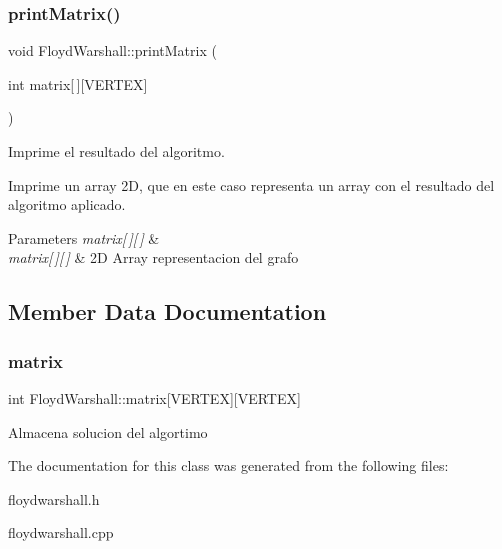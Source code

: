 \subsubsection{\texorpdfstring{print\+Matrix()}{printMatrix()}}
{\footnotesize\ttfamily void Floyd\+Warshall\+::print\+Matrix (\begin{DoxyParamCaption}\item[{int}]{matrix\mbox{[}$\,$\mbox{]}\mbox{[}\+V\+E\+R\+T\+E\+X\mbox{]} }\end{DoxyParamCaption})}



Imprime el resultado del algoritmo. 

Imprime un array 2D, que en este caso representa un array con el resultado del algoritmo aplicado.


\begin{DoxyParams}{Parameters}
{\em matrix\mbox{[}$\,$\mbox{]}\mbox{[}$\,$\mbox{]}} & \\
\hline
{\em matrix\mbox{[}$\,$\mbox{]}\mbox{[}$\,$\mbox{]}} & 2D Array representacion del grafo \\
\hline
\end{DoxyParams}


\subsection{Member Data Documentation}
\mbox{\label{classFloydWarshall_a391d930a37f05729d69d27374e715c33}} 
\subsubsection{\texorpdfstring{matrix}{matrix}}
{\footnotesize\ttfamily int Floyd\+Warshall\+::matrix\mbox{[}V\+E\+R\+T\+EX\mbox{]}\mbox{[}V\+E\+R\+T\+EX\mbox{]}}

Almacena solucion del algortimo 

The documentation for this class was generated from the following files\+:\begin{DoxyCompactItemize}
\item 
floydwarshall.\+h\item 
floydwarshall.\+cpp\end{DoxyCompactItemize}
